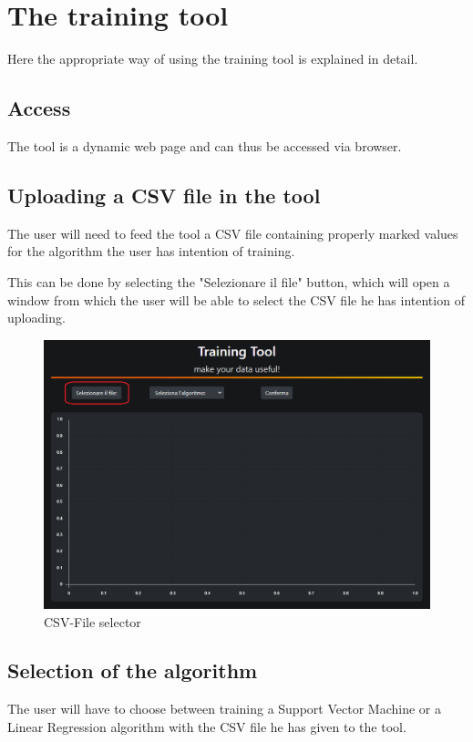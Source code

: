 \section{The training tool}
Here the appropriate way of using the training tool is explained in detail.

\subsection{Access}
The tool is a dynamic web page and can thus be accessed via browser.

\subsection{Uploading a CSV file in the tool}
The user will need to feed the tool a CSV file containing properly marked values for the algorithm the user has intention of training.

This can be done by selecting the "Selezionare il file" button, which will open a window from which the user will be able to select the CSV file he has intention of uploading.

\begin{figure}[H]
\centering
\includegraphics[scale=0.65]{img/tool/pointer_tool_1.png}
\caption{CSV-File selector}
\end{figure}
\newpage

\subsection{Selection of the algorithm}
The user will have to choose between training a Support Vector Machine or a Linear Regression algorithm with the CSV file he has given to the tool.

